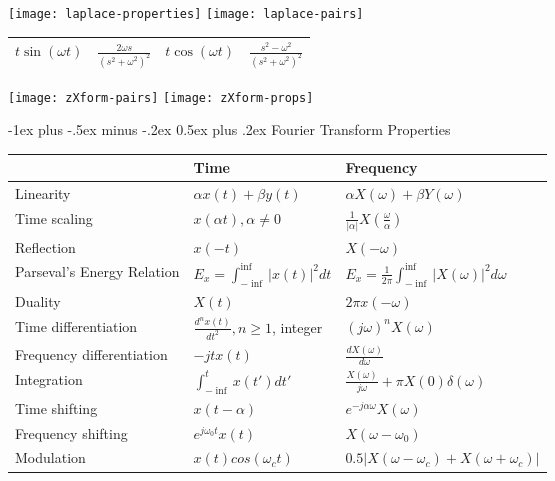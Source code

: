 \documentclass[12pt,landscape,letterpaper]{article}
\makeatletter
\renewcommand{\section}{\@startsection{section}{1}{0mm}%
                                {-1ex plus -.5ex minus -.2ex}%
                                {0.5ex plus .2ex}%
                                {\normalfont\normalsize\bfseries}}
\makeatother
\begin{document}
\begin{multicols*}{2}
	\texttt{[image: laplace-properties]}
	\texttt{[image: laplace-pairs]}
	\begin{tabular}{|c c|c c|}
		\hline
		$t\sin(\omega t)$ & $\frac{2\omega s}{(s^2 + \omega ^2)^2}$ & $t\cos(\omega t)$ & $\frac{s^2 - \omega ^2}{(s^2 + \omega ^2)^2}$\\
		\hline
	\end{tabular}
	\texttt{[image: zXform-pairs]}
	\texttt{[image: zXform-props]}

\end{multicols*}
\newpage
\begin{multicols*}{2}
	\section{Fourier Transform Properties}
	\begin{tabularx}{0.5\textwidth}{|>{\raggedright\arraybackslash}X|>{\raggedright\arraybackslash}X|>{\raggedright\arraybackslash}X|}
		\hline
		& \textbf{Time} & \textbf{Frequency}\\
		\hline
		Linearity & $\alpha x(t) +\beta y(t)$ & $\alpha X(\omega) + \beta Y(\omega)$\\
		\hline
		Time scaling & $x(\alpha t), \alpha \neq 0$ & $\frac{1}{|\alpha |}X(\frac{\omega}{\alpha})$\\
		\hline
		Reflection & $x(-t)$ & $X(-\omega)$\\
		\hline
		Parseval's Energy Relation & $E_x = \int_{-\inf}^{\inf} |x(t)|^2 dt$ & $E_x = \frac{1}{2\pi}\int_{-\inf}^{\inf} |X(\omega)|^2 d\omega$\\
		\hline
		Duality & $X(t)$ & $2\pi x(-\omega)$\\
		\hline
		Time differentiation & $\frac{d^nx(t)}{dt^2}, n\ge 1$, integer & $(j\omega)^nX(\omega)$\\
		\hline
		Frequency differentiation & $-jtx(t)$ & $\frac{dX(\omega)}{d\omega}$\\
		\hline
		Integration & $\int_{-\inf}^{t}x(t')dt'$ & $\frac{X(\omega)}{j\omega}+\pi X(0)\delta (\omega)$\\
		\hline
		Time shifting & $x(t-\alpha)$ & $e^{-j\alpha \omega}X(\omega)$\\
		\hline
		Frequency shifting & $e^{j\omega_0 t}x(t)$ & $X(\omega - \omega_0)$\\
		\hline
		Modulation & $x(t)cos(\omega _c t)$ & $0.5|X(\omega - \omega _c) + X(\omega + \omega _c)|$\\

\end{tabularx}
\end{multicols*}
\end{document}

